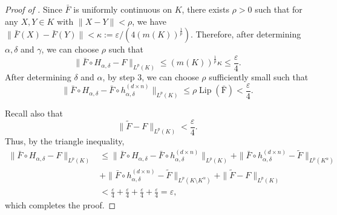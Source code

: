 \documentclass{article}
\begin{document}
\begin{proof}[Proof of ]
    Since $\bar F$ is uniformly continuous on $K$, there exists $\rho>0$ such that for any $X, Y\in K$ with  $\|X-Y\|<\rho$, we have $\|\bar F(X)-\bar F(Y)\|<\kappa:=\varepsilon/(4(m(K))^{\frac{1}{p}})$. Therefore, after determining $\alpha, \delta$ and $\gamma$, we can choose $\rho$ such that
     \begin{equation}
        \|\bar F\circ H_{\alpha,\delta}-F\|_{L^p(K)}\le (m(K))^{\frac{1}{p}}\kappa \le \frac{\varepsilon}{4}.
     \end{equation}After determining $\delta$ and $\alpha$, by step 3, we can choose $\rho$ sufficiently small such that 
     \begin{equation}
        \| \bar{F}\circ H_{\alpha,\delta} - \bar{F}\circ h_{\alpha,\delta}^{(d\times n)}\|_{L^p(K)}\le \rho \operatorname{\operatorname{Lip}(\bar F)}<\frac{\varepsilon}{4}.
     \end{equation}

    Recall also that
    \[
    \|\tilde{F} - F\|_{L^p(K)} < \frac{\varepsilon}{4}.
    \]
    Thus, by the triangle inequality,
    \begin{equation}
    \begin{aligned}
    \| \bar{F}\circ H_{\alpha,\delta} - F\|_{L^p(K)}& \le \| \bar{F}\circ H_{\alpha,\delta} - \bar{F}\circ h_{\alpha,\delta}^{(d\times n)}\|_{L^p(K)}+\|\bar{F}\circ h_{\alpha,\delta}^{(d\times n)}-\tilde F \|_{L^p(K^\alpha)} \\
    & + \|\bar{F}\circ h_{\alpha,\delta}^{(d\times n)}-\tilde F \|_{L^p(K\setminus K^\alpha)} + \|\tilde F - F\|_{L^p(K)}\\
    & < \frac{\varepsilon}{4} + \frac{\varepsilon}{4} + \frac{\varepsilon}{4} + \frac{\varepsilon}{4} = \varepsilon,
    \end{aligned}
    \end{equation}
    which completes the proof.
    \end{proof}
\end{document}
